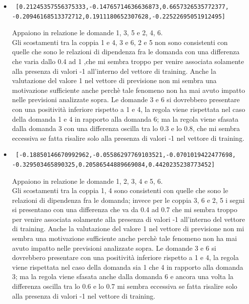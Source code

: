 \begin{itemize}
\item \begin{verbatim} [0.21245357556375333,-0.14765714636636873,0.6657326535772377,
-0.20946168513372712,0.1911180652307628,-0.22522695051912495]
\end{verbatim}
Appaiono in relazione le domande 1, 3, 5  e 2, 4, 6.\\
Gli scostamenti tra la coppia 1 e 4, 3 e 6, 2 e 5 non sono consistenti con quelle che sono le relazioni di dipendenza fra le domanda con una differenza che varia dallo 0.4 ad 1 ,che mi sembra troppo per venire associata solamente alla presenza di valori -1 all'interno del vettore di training. Anche la valutazione del valore 1 nel vettore di previsione non mi sembra una motivazione sufficiente anche perch\`e tale fenomeno non ha mai avuto impatto nelle previsioni analizzate sopra.
Le domande 3 e 6 si dovrebbero presentare con una positivit\`a inferiore rispetto a 1 e 4, la regola viene rispettata nel caso della domanda 1 e 4 in rapporto alla domanda 6; ma la regola viene sfasata dalla domanda 3 con una differenza oscilla tra lo 0.3 e lo 0.8, che mi sembra eccessiva se fatta risalire solo alla presenza di valori -1 nel vettore di training.


\item \begin{verbatim} [-0.18850146670992962,-0.05586297769103521,-0.0701019422477698,
-0.329503465890325,0.20586544889669084,0.4420235238773452]
\end{verbatim}
Appaiono in relazione le domande 1, 2, 3, 4  e 5, 6.\\
Gli scostamenti tra la coppia 1, 4 sono consistenti con quelle che sono le relazioni di dipendenza fra le domanda; invece per le coppia 3, 6 e 2, 5 i segni si presentano con una differenza che va da 0.4 ad 0.7 che mi sembra troppo per venire associata solamente alla presenza di valori -1 all'interno del vettore di training. Anche la valutazione del valore 1 nel vettore di previsione non mi sembra una motivazione sufficiente anche perch\`e tale fenomeno non ha mai avuto impatto nelle previsioni analizzate sopra.
Le domande 3 e 6 si dovrebbero presentare con una positivit\`a inferiore rispetto a 1 e 4, la regola viene rispettata nel caso della domanda sia 1 che 4 in rapporto alla domanda 3; ma la regola viene sfasata anche dalla domanda 6 e ancora una volta la differenza oscilla tra lo 0.6 e lo 0.7 mi sembra eccessiva se fatta risalire solo alla presenza di valori -1 nel vettore di training.
\end{itemize}

